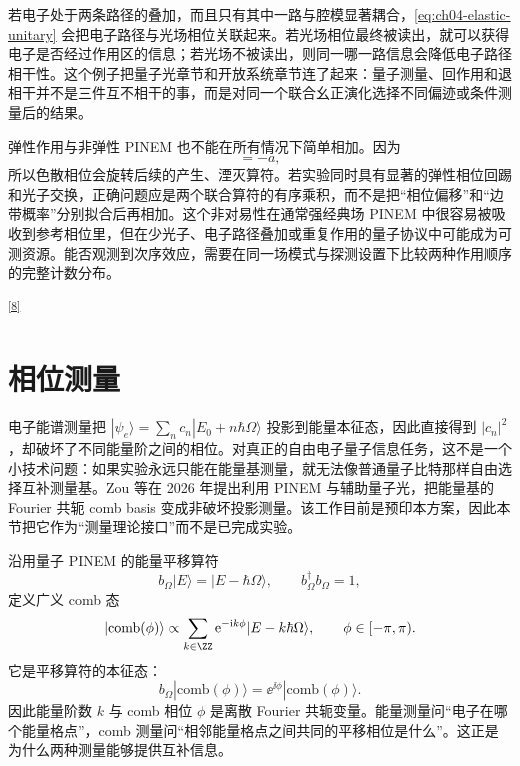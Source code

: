 若电子处于两条路径的叠加，而且只有其中一路与腔模显著耦合，\cref{eq:ch04-elastic-unitary} 会把电子路径与光场相位关联起来。若光场相位最终被读出，就可以获得电子是否经过作用区的信息；若光场不被读出，则同一哪一路信息会降低电子路径相干性。这个例子把量子光章节和开放系统章节连了起来：量子测量、回作用和退相干并不是三件互不相干的事，而是对同一个联合幺正演化选择不同偏迹或条件测量后的结果。

弹性作用与非弹性 PINEM 也不能在所有情况下简单相加。因为
\begin{equation}
[\hat n_\gamma,a]=-a,
\end{equation}
所以色散相位会旋转后续的产生、湮灭算符。若实验同时具有显著的弹性相位回踢和光子交换，正确问题应是两个联合算符的有序乘积，而不是把“相位偏移”和“边带概率”分别拟合后再相加。这个非对易性在通常强经典场 PINEM 中很容易被吸收到参考相位里，但在少光子、电子路径叠加或重复作用的量子协议中可能成为可测资源。能否观测到次序效应，需要在同一场模式与探测设置下比较两种作用顺序的完整计数分布。


\textsuperscript{\hyperref[ch04-ref8]{[8]}}
\section{相位测量}
电子能谱测量把 $|\psi_e\rangle=\sum_n c_n|E_0+n\hbar\Omega\rangle$ 投影到能量本征态，因此直接得到 $|c_n|^2$，却破坏了不同能量阶之间的相位。对真正的自由电子量子信息任务，这不是一个小技术问题：如果实验永远只能在能量基测量，就无法像普通量子比特那样自由选择互补测量基。Zou 等在 2026 年提出利用 PINEM 与辅助量子光，把能量基的 Fourier 共轭 comb basis 变成非破坏投影测量。该工作目前是预印本方案，因此本节把它作为“测量理论接口”而不是已完成实验。

沿用量子 PINEM 的能量平移算符
\begin{equation}
b_\Omega|E\rangle=|E-\hbar\Omega\rangle,
\qquad b_\Omega^\dagger b_\Omega=1,
\label{eq:ch04-comb-shift}
\end{equation}
定义广义 comb 态
\begin{equation}
|\mathrm{comb}(\phi)\rangle
\propto\sum_{k\in\ZZ}\ee^{-\ii k\phi}|E-k\hbar\Omega\rangle,
\qquad \phi\in[-\pi,\pi).
\label{eq:ch04-comb-state}
\end{equation}
它是平移算符的本征态：
\begin{equation}
b_\Omega|\mathrm{comb}(\phi)\rangle=\ee^{\ii\phi}|\mathrm{comb}(\phi)\rangle.
\label{eq:ch04-comb-eigen}
\end{equation}
因此能量阶数 $k$ 与 comb 相位 $\phi$ 是离散 Fourier 共轭变量。能量测量问“电子在哪个能量格点”，comb 测量问“相邻能量格点之间共同的平移相位是什么”。这正是为什么两种测量能够提供互补信息。

